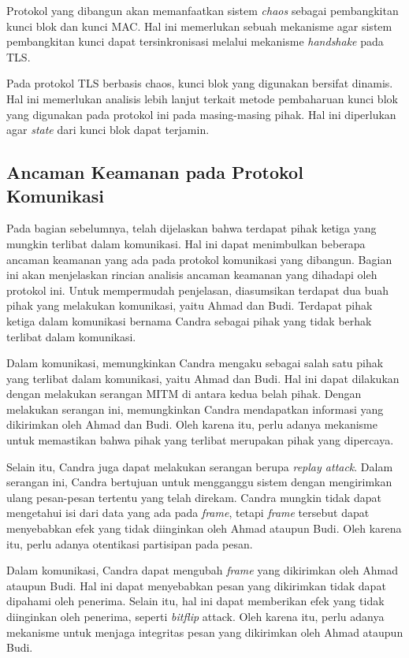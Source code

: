 Protokol yang dibangun akan memanfaatkan sistem \emph{chaos} sebagai pembangkitan kunci blok dan kunci MAC. Hal ini memerlukan sebuah mekanisme agar sistem pembangkitan kunci dapat tersinkronisasi melalui mekanisme \emph{handshake} pada TLS. 

Pada protokol TLS berbasis chaos, kunci blok yang digunakan bersifat dinamis. Hal ini memerlukan analisis lebih lanjut terkait metode pembaharuan kunci blok yang digunakan pada protokol ini pada masing-masing pihak. Hal ini diperlukan agar \emph{state} dari kunci blok dapat terjamin.

\subsection{Ancaman Keamanan pada Protokol Komunikasi}

Pada bagian sebelumnya, telah dijelaskan bahwa terdapat pihak ketiga yang mungkin terlibat dalam komunikasi. Hal ini dapat menimbulkan beberapa ancaman keamanan yang ada pada protokol komunikasi yang dibangun. Bagian ini akan menjelaskan rincian analisis ancaman keamanan yang dihadapi oleh protokol ini. Untuk mempermudah penjelasan, diasumsikan terdapat dua buah pihak yang melakukan komunikasi, yaitu Ahmad dan Budi. Terdapat pihak ketiga dalam komunikasi bernama Candra sebagai pihak yang tidak berhak terlibat dalam komunikasi. 

Dalam komunikasi, memungkinkan Candra mengaku sebagai salah satu pihak yang terlibat dalam komunikasi, yaitu Ahmad dan Budi. Hal ini dapat dilakukan dengan melakukan serangan MITM di antara kedua belah pihak. Dengan melakukan serangan ini, memungkinkan Candra mendapatkan informasi yang dikirimkan oleh Ahmad dan Budi. Oleh karena itu, perlu adanya mekanisme untuk memastikan bahwa pihak yang terlibat merupakan pihak yang dipercaya.

Selain itu, Candra juga dapat melakukan serangan berupa \emph{replay attack}. Dalam serangan ini, Candra bertujuan untuk mengganggu sistem dengan mengirimkan ulang pesan-pesan tertentu yang telah direkam. Candra mungkin tidak dapat mengetahui isi dari data yang ada pada \emph{frame}, tetapi \emph{frame} tersebut dapat menyebabkan efek yang tidak diinginkan oleh Ahmad ataupun Budi. Oleh karena itu, perlu adanya otentikasi partisipan pada pesan.

Dalam komunikasi, Candra dapat mengubah \emph{frame} yang dikirimkan oleh Ahmad ataupun Budi. Hal ini dapat menyebabkan pesan yang dikirimkan tidak dapat dipahami oleh penerima. Selain itu, hal ini dapat memberikan efek yang tidak diinginkan oleh penerima, seperti \emph{bitflip} attack. Oleh karena itu, perlu adanya mekanisme untuk menjaga integritas pesan yang dikirimkan oleh Ahmad ataupun Budi.

